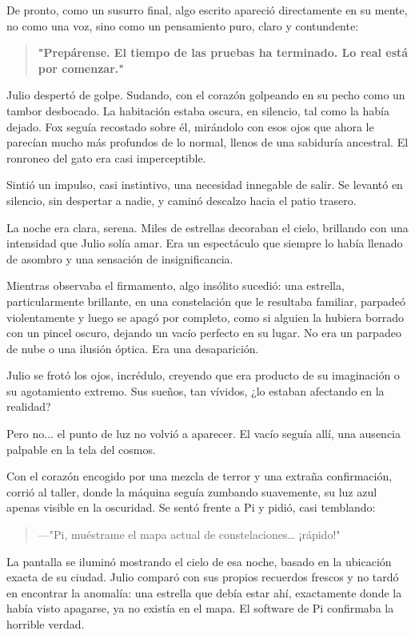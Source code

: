\documentclass[a4paper,12pt]{book}
\begin{document}
De pronto, como un susurro final, algo escrito apareció directamente en su mente, no como una voz, sino como un pensamiento puro, claro y contundente:

\begin{quote}
    \textbf{"Prepárense. El tiempo de las pruebas ha terminado. Lo real está por comenzar."}
\end{quote}

Julio despertó de golpe. Sudando, con el corazón golpeando en su pecho como un tambor desbocado. La habitación estaba oscura, en silencio, tal como la había dejado. Fox seguía recostado sobre él, mirándolo con esos ojos que ahora le parecían mucho más profundos de lo normal, llenos de una sabiduría ancestral. El ronroneo del gato era casi imperceptible.

Sintió un impulso, casi instintivo, una necesidad innegable de salir. Se levantó en silencio, sin despertar a nadie, y caminó descalzo hacia el patio trasero.

La noche era clara, serena. Miles de estrellas decoraban el cielo, brillando con una intensidad que Julio solía amar. Era un espectáculo que siempre lo había llenado de asombro y una sensación de insignificancia.

Mientras observaba el firmamento, algo insólito sucedió: una estrella, particularmente brillante, en una constelación que le resultaba familiar, parpadeó violentamente y luego se apagó por completo, como si alguien la hubiera borrado con un pincel oscuro, dejando un vacío perfecto en su lugar. No era un parpadeo de nube o una ilusión óptica. Era una desaparición.

Julio se frotó los ojos, incrédulo, creyendo que era producto de su imaginación o su agotamiento extremo. Sus sueños, tan vívidos, ¿lo estaban afectando en la realidad?

Pero no... el punto de luz no volvió a aparecer. El vacío seguía allí, una ausencia palpable en la tela del cosmos.

Con el corazón encogido por una mezcla de terror y una extraña confirmación, corrió al taller, donde la máquina seguía zumbando suavemente, su luz azul apenas visible en la oscuridad. Se sentó frente a Pi y pidió, casi temblando:

\begin{quote}
    —"Pi, muéstrame el mapa actual de constelaciones… ¡rápido!"
\end{quote}

La pantalla se iluminó mostrando el cielo de esa noche, basado en la ubicación exacta de su ciudad. Julio comparó con sus propios recuerdos frescos y no tardó en encontrar la anomalía: una estrella que debía estar ahí, exactamente donde la había visto apagarse, ya no existía en el mapa. El software de Pi confirmaba la horrible verdad.
\end{document}
